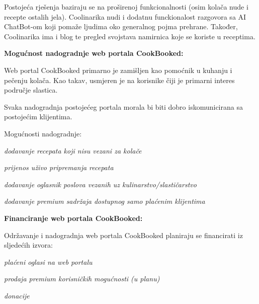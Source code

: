 		\bigskip
		\bigskip
		\bigskip

		Postojeća rješenja baziraju se na proširenoj funkcionalnosti (osim kolača nude i recepte ostalih jela).
		Coolinarika nudi i dodatnu funckionalost razgovora sa AI ChatBot-om koji pomaže ljudima oko generalnog
		pojma prehrane. Također, Coolinarika ima i blog te pregled svojstava namirnica koje se koriste u receptima.

		\bigskip

		\textbf{Mogućnost nadogradnje web portala CookBooked:}

		Web portal CookBooked primarno je zamišljen kao pomoćnik u kuhanju i pečenju kolača.
		Kao takav, usmjeren je na korisnike čiji je primarni interes područje slastica.

		\smallskip

		Svaka nadogradnja postojećeg portala morala bi biti dobro iskomunicirana sa postojećim klijentima.

		\smallskip

		Mogućnosti nadogradnje:
		
		\begin{packed_item}
			\item \textit{dodavanje recepata koji nisu vezani za kolače}
			\item \textit{prijenos uživo pripremanja recepata}
			\item \textit{dodavanje oglasnik poslova vezanih uz kulinarstvo/slastičarstvo}
			\item \textit{dodavanje premium sadržaja dostupnog samo plaćenim klijentima}
		\end{packed_item}

		\textbf{Financiranje web portala CookBooked:}

		Održavanje i nadogradnja web portala CookBooked planiraju se financirati iz sljedećih izvora:

		\begin{packed_item}
			\item \textit{plaćeni oglasi na web portalu}
			\item \textit{prodaja premium korisničkih mogućnosti (u planu)}
			\item \textit{donacije}
		\end{packed_item}




		\eject
		
	